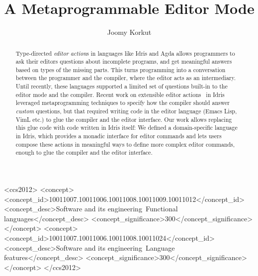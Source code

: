 \documentclass[sigplan, authordraft]{acmart}
\begin{document}
\title[A Metaprogrammable Editor Mode]{A Metaprogrammable Editor Mode}

\author{Joomy Korkut}

\renewcommand{\shortauthors}{Joomy Korkut}

\begin{abstract}
  Type-directed \emph{editor action}s in languages like Idris and Agda allows programmers to
  ask their editors questions about incomplete programs, and get
  meaningful answers based on types of the missing parts.
  This turns programming into a conversation between the programmer and the
  compiler, where the editor acts as an intermediary.
  Until recently, these languages supported a limited set of questions built-in
  to the editor mode and the compiler.  Recent work on extensible editor
  actions~\cite{extensible} in Idris leveraged metaprogramming
  techniques to specify how the compiler should answer \emph{custom} questions,
  but that required writing code in the editor language (Emacs Lisp, VimL etc.) to
  glue the compiler and the editor interface. Our work allows replacing this
  glue code with code written in Idris itself: We defined a domain-specific
  language in Idris, which provides a monadic interface for editor commands and
  lets users compose these actions in meaningful ways to define more complex
  editor commands, enough to glue the compiler and the editor interface.
\end{abstract}

%
%
 \begin{CCSXML}
<ccs2012>
<concept>
<concept_id>10011007.10011006.10011008.10011009.10011012</concept_id>
<concept_desc>Software and its engineering~Functional languages</concept_desc>
<concept_significance>300</concept_significance>
</concept>
<concept>
<concept_id>10011007.10011006.10011008.10011024</concept_id>
<concept_desc>Software and its engineering~Language features</concept_desc>
<concept_significance>300</concept_significance>
</concept>
</ccs2012>
\end{CCSXML}

\end{document}
